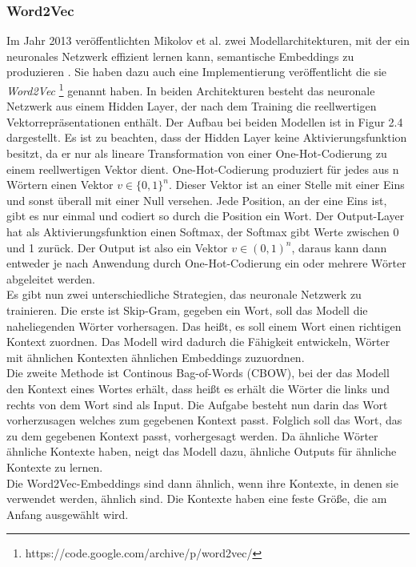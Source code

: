 \documentclass[12pt,letterpaper,ngerman]{article}
\begin{document}
\subsubsection{Word2Vec}
Im Jahr 2013 veröffentlichten Mikolov et al.  
zwei Modellarchitekturen, mit der ein
neuronales Netzwerk effizient lernen kann, semantische Embeddings
zu produzieren
\cite{word2vec}.
Sie haben dazu auch eine Implementierung veröffentlicht die sie 
\textit{Word2Vec} \footnote{https://code.google.com/archive/p/word2vec/}
genannt haben.
In beiden Architekturen besteht das neuronale Netzwerk aus einem 
Hidden Layer, der nach dem Training die reellwertigen 
Vektorrepräsentationen enthält.
Der Aufbau bei beiden Modellen ist in Figur 2.4 dargestellt.
Es ist zu beachten, dass der Hidden Layer keine Aktivierungsfunktion 
besitzt, da er nur als lineare Transformation von einer 
One-Hot-Codierung zu einem reellwertigen Vektor dient.
One-Hot-Codierung produziert für jedes aus n Wörtern einen Vektor
$v \in \{0,1\}^n$. Dieser Vektor ist an einer Stelle mit einer Eins
und sonst überall mit einer Null versehen. Jede Position, an der eine
Eins ist, gibt es nur einmal und codiert so durch die Position ein Wort.
Der Output-Layer hat als Aktivierungsfunktion einen Softmax, der 
Softmax gibt Werte zwischen 0 und 1 zurück. Der Output ist also ein 
Vektor $v \in (0,1)^n$, daraus kann dann entweder je nach Anwendung 
durch One-Hot-Codierung ein oder mehrere Wörter abgeleitet werden.\\
Es gibt nun zwei unterschiedliche Strategien, das neuronale Netzwerk
zu trainieren. Die erste ist Skip-Gram, gegeben ein Wort, soll das
Modell die naheliegenden Wörter vorhersagen. Das heißt, es soll einem
Wort einen richtigen Kontext zuordnen. Das Modell wird dadurch die
Fähigkeit entwickeln, Wörter mit ähnlichen Kontexten ähnlichen 
Embeddings zuzuordnen.\\
Die zweite Methode ist Continous Bag-of-Words (CBOW),
bei der das Modell den Kontext eines Wortes erhält,
dass heißt es erhält die Wörter die links und rechts von dem Wort
sind als Input. Die Aufgabe besteht nun darin das Wort vorherzusagen
welches zum gegebenen Kontext passt.
Folglich soll das Wort, das zu dem gegebenen Kontext passt,
vorhergesagt werden.
Da ähnliche Wörter ähnliche Kontexte haben, neigt das Modell dazu,
ähnliche Outputs für ähnliche Kontexte zu lernen.\\
Die Word2Vec-Embeddings sind dann ähnlich, wenn ihre Kontexte,
in denen sie verwendet werden, ähnlich sind.  
Die Kontexte haben eine feste Größe, die am Anfang ausgewählt wird.
\end{document}

